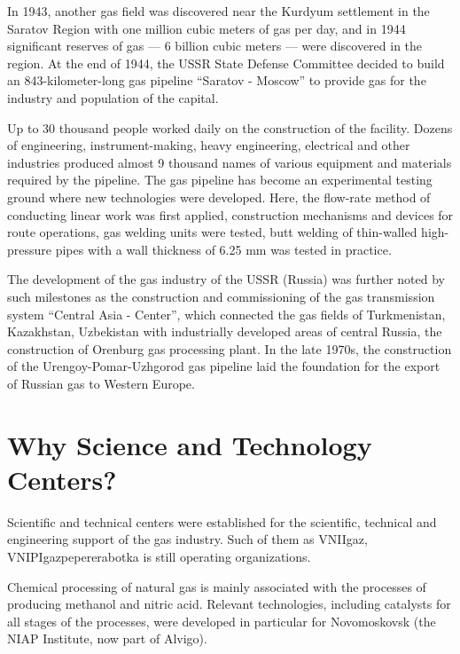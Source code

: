 \documentclass[12pt]{report}
\theoremstyle{definition}
\begin{document}
In 1943, another gas field was discovered near the Kurdyum settlement in the Saratov Region with one million cubic meters of gas per day, and in 1944 significant reserves of gas — 6 billion cubic meters — were discovered in the region.
At the end of 1944, the USSR State Defense Committee decided to build an 843-kilometer-long gas pipeline ``Saratov - Moscow'' to provide gas for the industry and population of the capital.

Up to 30 thousand people worked daily on the construction of the facility.
Dozens of engineering, instrument-making, heavy engineering, electrical and other industries produced almost 9 thousand 
names of various equipment and materials required by the pipeline.
The gas pipeline has become an experimental testing ground where new technologies were developed.
Here, the flow-rate method of conducting linear work was first applied, construction mechanisms and devices for route operations, gas welding units were tested, butt welding of thin-walled high-pressure pipes with a wall thickness of 6.25 mm was tested in practice.

The development of the gas industry of the USSR (Russia) was further noted by such milestones as the construction and commissioning of the gas transmission system ``Central Asia - Center'', which connected the gas fields of Turkmenistan, Kazakhstan, Uzbekistan with industrially developed areas of central Russia, the construction of Orenburg gas processing plant.
In the late 1970s, the construction of the Urengoy-Pomar-Uzhgorod gas pipeline laid the foundation for the export of Russian gas to Western Europe.

\section{Why Science and Technology Centers?}

Scientific and technical centers were established for the scientific, technical and engineering support of the gas industry.
Such of them as VNIIgaz, VNIPIgazpepererabotka is still operating organizations.

Chemical processing of natural gas is mainly associated with the processes of producing methanol and nitric acid.
Relevant technologies, including catalysts for all stages of the processes, were developed in particular for Novomoskovsk (the NIAP Institute, now part of Alvigo).
\end{document}
